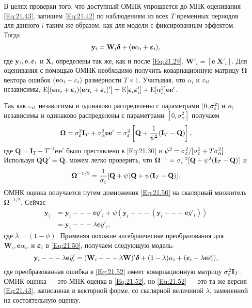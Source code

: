 В целях проверки того, что доступный ОМНК упрощается до МНК оценивания \ref{Eq:21.43}, запишем \ref{Eq:21.42} по наблюдениям из всех $T$ временных периодов для данного $i$ таким же образом, как для модели с фиксированным эффектом. Тогда
 \begin{align}
\mathbf y_i=\mathbf W_i \bm\delta + (\mathbf e \alpha_i + \bm{\varepsilon}_i),
\label{Eq:21.50}
\end{align}
где $\mathbf y_i, \mathbf e, \bm{\varepsilon}_i$ и $\mathbf X_i$ определены так же, как и после \ref{Eq:21.29}, $\mathbf W'_i = [\mathbf e \; \mathbf X'_i]$. Для оценивания с помощью ОМНК необходимо получить ковариационную матрицу $\bm\Omega$ вектора ошибок $(\mathbf e \alpha_i +\varepsilon_i)$ размерности $T \times 1$. Учитывая, что $\alpha_i$ и $\varepsilon_{it}$ независимы, $\mathrm E[( \mathbf e \alpha_i+\bm{\varepsilon}_{i})( \mathbf e \alpha_i+\bm{\varepsilon}_{i})']=\mathrm E[\bm{\varepsilon}_i \bm{\varepsilon}'_i]+\mathrm E[\alpha^2_i]\mathbf e \mathbf e'$.

Так как $\varepsilon_{it}$ независимы и одинаково распределены с параметрами $[0, \sigma^2_\varepsilon]$ и $\alpha_i$ независимы и одинаково распределены с параметрами $[0,\sigma^2_\alpha]$ получаем
 \begin{align}
\bm\Omega=\sigma^2_\varepsilon \mathbf I_T + \sigma^2_{\alpha} \mathbf e \mathbf e'=\sigma^2_\varepsilon
\left[\mathbf Q+ \frac{1}{\psi^2}(\mathbf I_T-\mathbf Q) \right],
\nonumber
\end{align}
где $\mathbf Q= \mathbf I_T-T^{-1} \mathbf e \mathbf e'$ было преставлено в \ref{Eq:21.30} и $\psi^2=\sigma^2_\varepsilon/[\sigma^2_\varepsilon+T \sigma^2_\alpha]$. Используя 
$\mathbf Q \mathbf Q'= \mathbf Q$, можем легко проверить, что $\bm\Omega^{-1}=\sigma^{-2}_\varepsilon[\mathbf Q + \psi^2(\mathbf I_T-\mathbf Q)]$ и 
 \begin{align}
\bm\Omega^{-1/2}=\frac{1}{\sigma_\varepsilon}[\mathbf Q +\psi (\mathbf Q +\psi (\mathbf I_T- \mathbf Q)].
\label{Eq:21.51}
\end{align}
ОМНК оценка получается путем домножения \ref{Eq:21.50} на скалярный множитель $\bm\Omega^{-1/2}$. Сейчас
 \begin{align}
[\bm\Omega+\psi (\mathbf I_T --- \mathbf Q)] \mathbf y_i
&=\mathbf y_i --- \mathbf e \bar{y}'_i + \psi(\mathbf y_i --- (\mathbf y_i --- \mathbf e \bar{y}'_i)) \nonumber \\
&=\mathbf y_i --- \lambda \mathbf e \bar{y}'_i,
\nonumber
\end{align}
где $\lambda=(1-\psi)$. Применяя похожие алгебраичесике преобразования для $\mathbf W_i, \mathbf e \alpha_i$, и $\bm{\varepsilon}_i$ в \ref{Eq:21.50}, получаем следующую модель:
 \begin{align}
\mathbf y_i --- \lambda \mathbf e \bar{y}'_i=(\mathbf W_i --- \lambda \bar{\mathbf W})'\bm\delta+(1-\lambda)\alpha_i+(\bm{\varepsilon}_i-\lambda \mathbf e \bar{\varepsilon}'_i),
\label{Eq:21.52}
\end{align}
где преобразованная ошибка в \ref{Eq:21.52} имеет ковариационную матрицу $\sigma^2_\varepsilon \mathbf I_T$. ОМНК оценка --- это МНК оценка в \ref{Eq:21.52}, но \ref{Eq:21.52} --- это та же версия \ref{Eq:21.43}, записанная в векторной форме, со скалярной величиной $\lambda$, замененной на состоятельную оценку.

